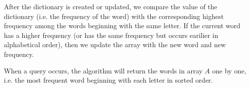 \documentclass[11pt, answers]{exam}
\theoremstyle{plain}
\theoremstyle{definition}
\begin{document}
\begin{questions}
\begin{solution}
\begin{enumerate}
After the dictionary is created or updated, we compare the value of the dictionary (i.e. the frequency of the word) with the corresponding highest frequency among the words beginning with the same letter. If the current word has a higher frequency (or has the same frequency but occurs earilier in alphabetical order), then we update the array with the new word and new frequency. 

When a query occurs, the algorithm will return the words in array $A$ one by one, i.e. the most frequent word beginning with each letter in sorted order.

\end{enumerate}
\end{solution}

\end{questions}
\end{document}
